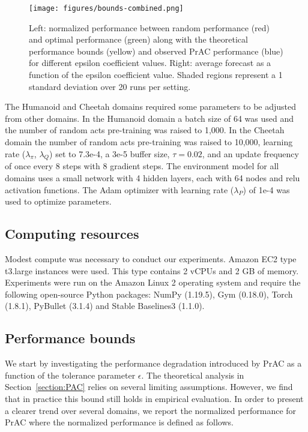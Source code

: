 \documentclass[letterpaper]{article} %
\begin{document}
            \begin{figure*}
                \texttt{[image: figures/bounds-combined.png]}
                \caption{Left: normalized performance between random performance (red) and optimal performance (green) along with the theoretical performance bounds (yellow) and observed PrAC performance (blue) for different epsilon coefficient values. Right: average forecast as a function of the epsilon coefficient value. Shaded regions represent a 1 standard deviation over 20 runs per setting.}
                \label{bounds}
            \end{figure*}

            The Humanoid and Cheetah domains required some parameters to be adjusted from other domains. In the Humanoid domain a batch size of 64 was used and the number of random acts pre-training was raised to 1,000. In the Cheetah domain the number of random acts pre-training was raised to 10,000, learning rate ($\lambda_\pi$, $\lambda_Q$) set to 7.3e-4, a 3e-5 buffer size, $\tau=0.02$, and an update frequency of once every 8 steps with 8 gradient steps.
            The environment model for all domains uses a small network with 4 hidden layers, each with 64 nodes and relu activation functions. The Adam optimizer with learning rate ($\lambda_P$) of 1e-4 was used to optimize parameters.



        \subsection{Computing resources}

            Modest compute was necessary to conduct our experiments. Amazon EC2 type t3.large instances were used. This type contains 2 vCPUs and 2 GB of memory. Experiments were run on the Amazon Linux 2 operating system and require the following open-source Python packages: NumPy (1.19.5), Gym (0.18.0), Torch (1.8.1), PyBullet (3.1.4) and Stable Baselines3 (1.1.0).

        \subsection{Performance bounds}

            We start by investigating the performance degradation introduced by PrAC as a function of the tolerance parameter $\epsilon$. The theoretical analysis in Section~\ref{section:PAC} relies on several limiting assumptions. However, we find that in practice this bound still holds in empirical evaluation. In order to present a clearer trend over several domains, we report the normalized performance for PrAC where the normalized performance is defined as follows.
\end{document}
